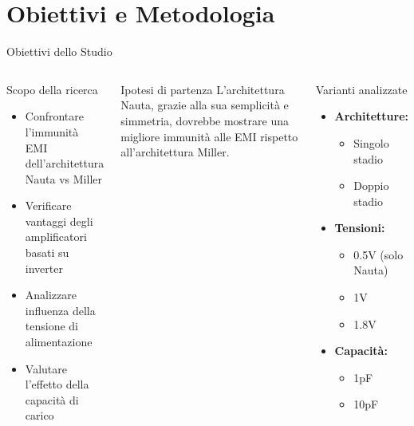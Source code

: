 \documentclass[aspectratio=169, 9pt]{beamer}
\begin{document}
\section{Obiettivi e Metodologia}

\begin{frame}{Obiettivi dello Studio}
    \begin{columns}
        \begin{block}{Scopo della ricerca}
            \begin{itemize}
                \item Confrontare l'immunità EMI dell'architettura Nauta vs Miller
                \item Verificare vantaggi degli amplificatori basati su inverter
                \item Analizzare influenza della tensione di alimentazione
                \item Valutare l'effetto della capacità di carico
            \end{itemize}
        \end{block}
        
        \begin{alertblock}{Ipotesi di partenza}
            L'architettura Nauta, grazie alla sua semplicità e simmetria, dovrebbe mostrare una migliore immunità alle EMI rispetto all'architettura Miller.
        \end{alertblock}
        
        \begin{block}{Varianti analizzate}
            \begin{itemize}\small
                \item \textbf{Architetture:} 
                      \begin{itemize}\footnotesize
                          \item Singolo stadio
                          \item Doppio stadio
                      \end{itemize}
                \item \textbf{Tensioni:} 
                      \begin{itemize}\footnotesize
                          \item 0.5V (solo Nauta)
                          \item 1V
                          \item 1.8V
                      \end{itemize}
                \item \textbf{Capacità:} 
                      \begin{itemize}\footnotesize
                          \item 1pF
                          \item 10pF
                      \end{itemize}
            \end{itemize}
        \end{block}
    \end{columns}
\end{frame}
\end{document}
